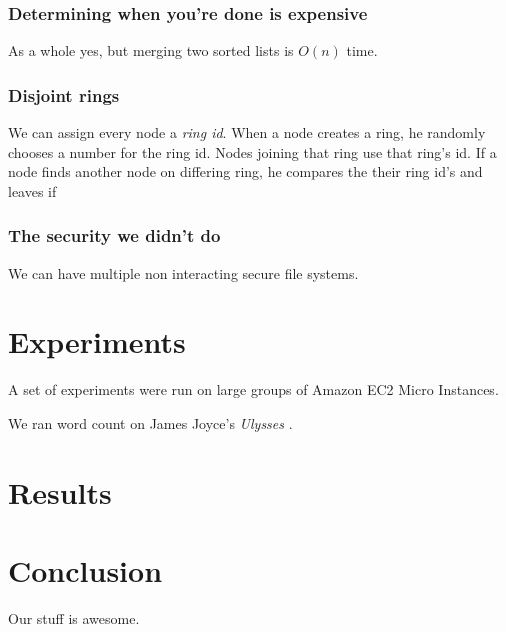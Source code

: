 \documentclass[conference, compsocconf, letterpaper]{IEEEtran}
\begin{document}
\subsubsection{Determining when you're done is expensive}
As a whole yes, but merging two sorted lists is $O(n)$ time. 


\subsubsection{Disjoint rings}
We can assign every node a \emph{ring id}.  When a node creates a ring, he randomly chooses a number for the ring id.  Nodes joining that ring use that ring's id.  If a node finds another node on differing ring, he compares the their ring id's and leaves if  

\subsubsection{The security we didn't do}
We can have multiple non interacting secure file systems.


\section{Experiments}
A set of experiments were run on large groups of Amazon EC2 Micro Instances\cite{amazon-micro}.

We ran word count on James Joyce's \emph{Ulysses} \cite{joyce1924ulysses}.


 
\section{Results}

\section{Conclusion}
Our stuff \cite{code} is awesome.



\end{document}

